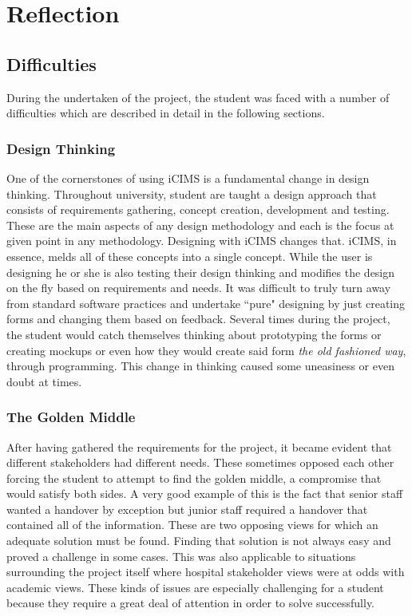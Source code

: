 \section{Reflection}

\subsection{Difficulties}
\label{Difficulties}
During the undertaken of the project, the student was faced with a number of difficulties which are described in detail in the following sections.

\subsubsection{Design Thinking}
One of the cornerstones of using iCIMS is a fundamental change in design thinking. Throughout university, student are taught a design approach that consists of requirements gathering, concept creation, development and testing. These are the main aspects of any design methodology and each is the focus at given point in any methodology. Designing with iCIMS changes that. iCIMS, in essence, melds all of these concepts into a single concept. While the user is designing he or she is also testing their design thinking and modifies the design on the fly based on requirements and needs. It was difficult to truly turn away from standard software practices and undertake ``pure" designing by just creating forms and changing them based on feedback. Several times during the project, the student would catch themselves thinking about prototyping the forms or creating mockups or even how they would create said form \emph{the old fashioned way}, through programming. This change in thinking caused some uneasiness or even doubt at times. 

\subsubsection{The Golden Middle}
After having gathered the requirements for the project, it became evident that different stakeholders had different needs. These sometimes opposed each other forcing the student to attempt to find the golden middle, a compromise that would satisfy both sides. A very good example of this is the fact that senior staff wanted a handover by exception but junior staff required a handover that contained all of the information. These are two opposing views for which an adequate solution must be found. Finding that solution is not always easy and proved a challenge in some cases. This was also applicable to situations surrounding the project itself where hospital stakeholder views were at odds with academic views. These kinds of issues are especially challenging for a student because they require  a great deal of attention in order to solve successfully.

